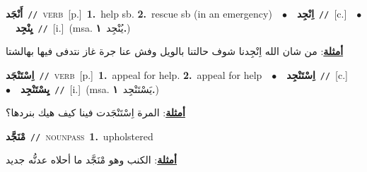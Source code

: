 \documentclass[10pt,a4paper,twoside]{article} %
\begin{document}
\begin{multicols}{2}
{\setlength\topsep{0pt}\textbf{\foreignlanguage{arabic}{أَنْجَد}}\ {\color{gray}\texttt{//}\color{black}}\ \textsc{verb}\ [p.]\ \textbf{1.}~help sb.  \textbf{2.}~rescue sb (in an emergency)\ \ $\bullet$\ \ \setlength\topsep{0pt}\textbf{\foreignlanguage{arabic}{اِنْجِد}}\ {\color{gray}\texttt{//}\color{black}}\ [c.]\ \ $\bullet$\ \ \setlength\topsep{0pt}\textbf{\foreignlanguage{arabic}{يِنْجِد}}\ {\color{gray}\texttt{//}\color{black}}\ [i.]\ \color{gray}(msa. \foreignlanguage{arabic}{يُنْجِد}~\foreignlanguage{arabic}{\textbf{١.}})\color{black}\  \begin{flushright}\color{gray}\foreignlanguage{arabic}{\textbf{\underline{\foreignlanguage{arabic}{أمثلة}}}: من شان الله اِنْجِدنا شوف حالتنا بالويل وفش عنا جرة غاز نتدفى فيها بهالشتا}\end{flushright}\color{black}} \vspace{2mm}

{\setlength\topsep{0pt}\textbf{\foreignlanguage{arabic}{اِسْتَنْجَد}}\ {\color{gray}\texttt{//}\color{black}}\ \textsc{verb}\ [p.]\ \textbf{1.}~appeal for help.  \textbf{2.}~appeal for help\ \ $\bullet$\ \ \setlength\topsep{0pt}\textbf{\foreignlanguage{arabic}{اِسْتَنْجِد}}\ {\color{gray}\texttt{//}\color{black}}\ [c.]\ \ $\bullet$\ \ \setlength\topsep{0pt}\textbf{\foreignlanguage{arabic}{يِسْتَنْجِد}}\ {\color{gray}\texttt{//}\color{black}}\ [i.]\ \color{gray}(msa. \foreignlanguage{arabic}{يَسْتَنْجِد}~\foreignlanguage{arabic}{\textbf{١.}})\color{black}\  \begin{flushright}\color{gray}\foreignlanguage{arabic}{\textbf{\underline{\foreignlanguage{arabic}{أمثلة}}}: المرة اِسْتَنْجَدت فينا كيف هيك بنردها؟}\end{flushright}\color{black}} \vspace{2mm}

{\setlength\topsep{0pt}\textbf{\foreignlanguage{arabic}{مْنَجَّد}}\ {\color{gray}\texttt{//}\color{black}}\ \textsc{noun\textunderscore pass}\ \textbf{1.}~upholstered\  \begin{flushright}\color{gray}\foreignlanguage{arabic}{\textbf{\underline{\foreignlanguage{arabic}{أمثلة}}}: الكنب وهو مْنَجَّد ما أحلاه عدنُّه جديد}\end{flushright}\color{black}} \vspace{2mm}


\end{multicols}
\end{document}

